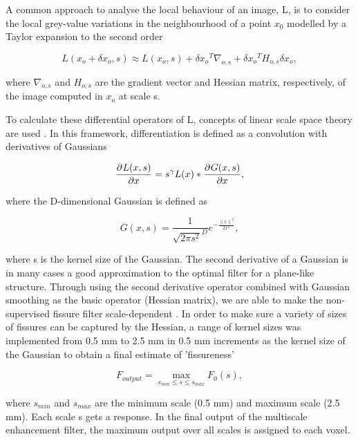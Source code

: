 {A common approach to analyse the local behaviour of an image, L, is to consider the local grey-value variations in the neighbourhood of a point $x_0$ modelled by a Taylor expansion to the second order

\begin{equation}
 \label{eq:FissureDetection1}
 L(x_o + \delta x_o, s) \approx L(x_o, s) + \delta{x_o}^T\nabla_{o,s} + \delta{x_o}^TH_{o,s}\delta x_o,
\end{equation}

\noindent where $\nabla_{o,s}$ and $H_{o,s}$ are the gradient vector and Hessian matrix, respectively, of the image computed in $x_o$ at scale s.

To calculate these differential operators of L, concepts of linear scale space theory are used \citep{koenderink1984structure,florack1992scale}. In this framework, differentiation is defined as a convolution with derivatives of Gaussians

\begin{equation}
 \label{eq:FissureDetection2}
 \frac{\partial^{} L(x,s)}{\partial x} = s^\gamma L(x)*\frac{\partial^{} G(x,s)}{\partial x},
\end{equation}

\noindent where the D-dimensional Gaussian is defined as

\begin{equation}
 \label{eq:FissureDetection3}
 G(x,s) = \frac{1}{{\sqrt{2\pi s^2}}^D}e^{-\frac{{\lVert x \rVert}^2}{2x^2}},
\end{equation}

\noindent where s is the kernel size of the Gaussian. The second derivative of a Gaussian is in many cases a good approximation to the optimal filter for a plane-like structure. Through using the second derivative operator combined with Gaussian smoothing as the basic operator (Hessian matrix), we are able to make the non-supervised fissure filter scale-dependent \citep{lorenz1997multi, li2003selective}. In order to make sure a variety of sizes of fissures can be captured by the Hessian, a range of kernel sizes was implemented from 0.5 mm to 2.5 mm in 0.5 mm increments as the kernel size of the Gaussian to obtain a final estimate of 'fissureness'

\begin{equation}
\label{eq:Multiscale}
F_{output} = \operatorname*{max}\limits_{s_{min}\leq s \leq s_{max}} F_0 (s),
\end{equation}

\noindent where $s_{min}$ and $s_{max}$ are the minimum scale (0.5 mm) and maximum scale (2.5 mm). Each scale s gets a response. In the final output of the multiscale enhancement filter, the maximum output over all scales is assigned to each voxel.

}

